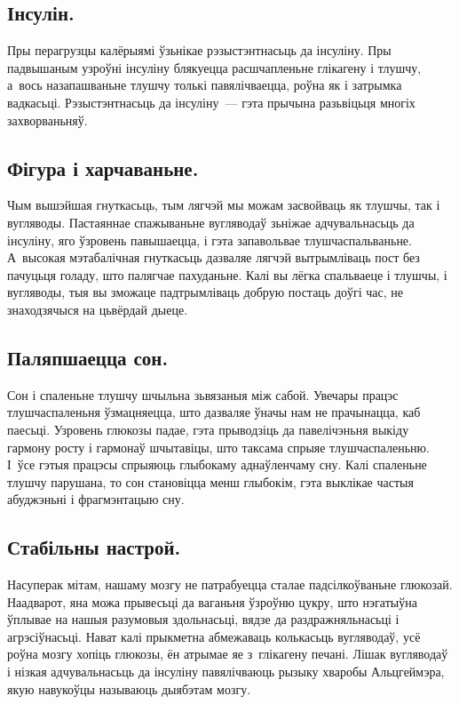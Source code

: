 
\subsection{Інсулін.}
Пры перагрузцы калёрыямі ўзьнікае рэзыстэнтнасьць да інсуліну. Пры падвышаным узроўні інсуліну блякуецца расшчапленьне глікагену і тлушчу, а~вось назапашваньне тлушчу толькі павялічваецца, роўна як і затрымка вадкасьці. Рэзыстэнтнасьць да інсуліну~--- гэта прычына разьвіцьця многіх захворваньняў.

\subsection{Фігура і харчаваньне.}
Чым вышэйшая гнуткасьць, тым лягчэй мы можам засвойваць як тлушчы, так і вугляводы. Пастаяннае спажываньне вугляводаў зьніжае адчувальнасьць да інсуліну, яго ўзровень павышаецца, і гэта запавольвае тлушчаспальваньне. А~высокая мэтабалічная гнуткасьць дазваляе лягчэй вытрымліваць пост без пачуцьця голаду, што палягчае пахуданьне. Калі вы лёгка спальваеце і тлушчы, і вугляводы, тыя вы зможаце падтрымліваць добрую постаць доўгі час, не знаходзячыся на цьвёрдай дыеце.

\subsection{Паляпшаецца сон.}
Сон і спаленьне тлушчу шчыльна зьвязаныя між сабой. Увечары працэс тлушчаспаленьня ўзмацняецца, што дазваляе ўначы нам не прачынацца, каб паесьці. Узровень глюкозы падае, гэта прыводзіць да павелічэньня выкіду гармону росту і гармонаў шчытавіцы, што таксама спрыяе тлушчаспаленьню. І~ўсе гэтыя працэсы спрыяюць глыбокаму аднаўленчаму сну. Калі спаленьне тлушчу парушана, то сон становіцца менш глыбокім, гэта выклікае частыя абуджэньні і фрагмэнтацыю сну.

\subsection{Стабільны настрой.}
Насуперак мітам, нашаму мозгу не патрабуецца сталае падсілкоўваньне глюкозай. Наадварот, яна можа прывесьці да ваганьня ўзроўню цукру, што нэгатыўна ўплывае на нашыя разумовыя здольнасьці, вядзе да раздражняльнасьці і агрэсіўнасьці. Нават калі прыкметна абмежаваць колькасьць вугляводаў, усё роўна мозгу хопіць глюкозы, ён атрымае яе з~глікагену печані. Лішак вугляводаў і нізкая адчувальнасьць да інсуліну павялічваюць рызыку хваробы Альцгеймэра, якую навукоўцы называюць дыябэтам мозгу.

